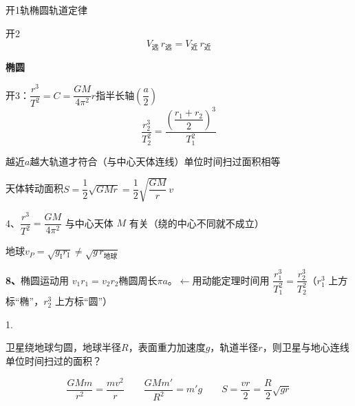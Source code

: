 开1\quad 轨椭圆轨道定律 %

开2
\[ V_{\text{远}}\,r_{\text{远}}=V_{\text{近}}\,r_{\text{近}} \] %

\textbf{椭圆}


开3：\quad $\dfrac{r^{3}}{T^{2}}=C=\dfrac{GM}{4\pi^{2}}$\quad $r$指半长轴$\left(\dfrac{a}{2}\right)$ %
\[ \frac{r_2^{3}}{T_2^{2}}=\frac{\left(\dfrac{r_1+r_2}{2}\right)^{3}}{T_1^{2}} \]

越近$a$越大\quad {}轨道才符合（与中心天体连线）单位时间扫过面积相等 %

天体转动面积\quad $S=\dfrac12\sqrt{GMr}=\dfrac12\sqrt{\dfrac{GM}{r}}\,v$%

4、$\dfrac{r^3}{T^2}=\dfrac{GM}{4\pi^2}$ 与中心天体 $M$ 有关（绕的中心不同就不成立）


地球\quad $v_P=\sqrt{g_{\mathrm{I}}r_{\mathrm{I}}}\neq\sqrt{g\,r_{\text{地球}}}$%

\textbf{8、}椭圆运动用 $v_1r_1=v_2r_2$\quad 椭圆周长$\pi a$。$\leftarrow$用动能定理\quad 时间用 $\dfrac{r_1^3}{T_1^2}=\dfrac{r_2^3}{T_2^2}$（$r_1^3$ 上方标“椭”，$r_2^3$ 上方标“圆”） %

1.
\begin{problem}
卫星绕地球匀圆，地球半径$R$，表面重力加速度$g$，轨道半径$r$，则卫星与地心连线单位时间扫过的面积？ %
\begin{solution}
\[
\frac{GMm}{r^2}=\frac{mv^2}{r}\qquad \frac{GMm'}{R^2}=m'g\qquad S=\frac{vr}{2}=\frac{R}{2}\sqrt{gr}
\]
\end{solution}
\end{problem}


